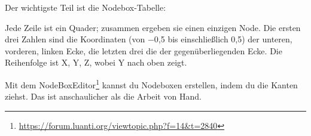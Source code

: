 \begin{Shaded}
\begin{Highlighting}[]
\OperatorTok{(}\OperatorTok{,} \OperatorTok{\{}
     \OperatorTok{=} \OperatorTok{,}
     \OperatorTok{=} \OperatorTok{,}
     \OperatorTok{=} \OperatorTok{\{}
         \OperatorTok{=} \OperatorTok{,}
         \OperatorTok{=} \OperatorTok{\{}
            \OperatorTok{\{} \OperatorTok{{-}}\OperatorTok{,} \OperatorTok{{-}}\OperatorTok{,} \OperatorTok{{-}}\OperatorTok{,} \OperatorTok{,} \OperatorTok{,}  \OperatorTok{\},}
            \OperatorTok{\{} \OperatorTok{{-}}\OperatorTok{,} \OperatorTok{,} \OperatorTok{,} \OperatorTok{,} \OperatorTok{,}  \OperatorTok{\},}
        \OperatorTok{\},}
    \OperatorTok{\},}
\OperatorTok{\})}
\end{Highlighting}
\end{Shaded}

Der wichtigste Teil ist die Nodebox-Tabelle:

\begin{Shaded}
\begin{Highlighting}[]
\OperatorTok{\{{-}}\OperatorTok{,} \OperatorTok{{-}}\OperatorTok{,} \OperatorTok{{-}}\OperatorTok{,}       \OperatorTok{,}    \OperatorTok{,}  \OperatorTok{\},}
\OperatorTok{\{{-}}\OperatorTok{,}    \OperatorTok{,}    \OperatorTok{,}       \OperatorTok{,}  \OperatorTok{,}  \OperatorTok{\}}
\end{Highlighting}
\end{Shaded}

Jede Zeile ist ein Quader; zusammen ergeben sie einen einzigen Node. Die
ersten drei Zahlen sind die Koordinaten (von −0,5 bis einschließlich
0,5) der unteren, vorderen, linken Ecke, die letzten drei die der
gegenüberliegenden Ecke. Die Reihenfolge ist X, Y, Z, wobei Y nach oben
zeigt.

Mit dem NodeBoxEditor\footnote{\url{https://forum.luanti.org/viewtopic.php?f=14&t=2840}}
kannst du Nodeboxen erstellen, indem du die Kanten ziehst. Das ist
anschaulicher als die Arbeit von Hand.

